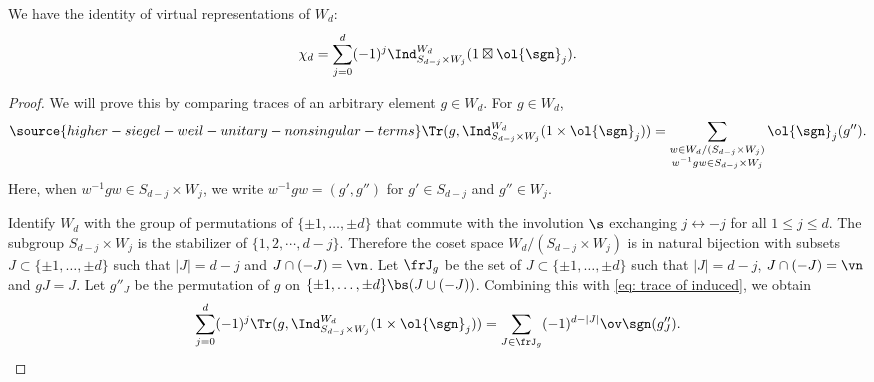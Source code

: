 \begin{lemma}
\notready We have the identity of virtual representations of $W_d$:
\[
\chi_d = \sum_{j=0}^{d} (-1)^j \Ind_{S_{d-j} \times W_j}^{W_d}(1 \boxtimes \ol{\sgn}_{j}).
\]
\end{lemma}
\begin{proof}
We will prove this by comparing traces of an arbitrary element $g \in W_d$.  For $g \in W_d$,
\begin{equation}\label{eq: trace of induced}
\source{higher-siegel-weil-unitary-nonsingular-terms}
\Tr(g, \Ind_{S_{d-j} \times W_j}^{W_d} (1 \times \ol{\sgn}_j))=\sum_{\substack{w\in W_{d}/(S_{d-j} \times W_j) \\ w^{-1}gw\in S_{d-j} \times W_j} } \ol{\sgn}_j(g'').
\end{equation}
Here, when $w^{-1}gw\in S_{d-j} \times W_j$, we write $w^{-1}gw=(g',g'')$ for $g'\in S_{d-j}$ and $g''\in W_{j}$.

Identify $W_d$ with the group of permutations of $\{\pm 1, \ldots, \pm d\}$ that commute with the involution $\s$ exchanging $j \leftrightarrow -j$ for all $1 \leq j \leq d$. The subgroup $S_{d-j}\times W_{j}$ is the stabilizer of $\{1,2,\cdots, d-j\}$. Therefore the coset space $W_{d}/(S_{d-j} \times W_j)$ is in natural bijection with subsets $J\subset \{\pm 1, \ldots, \pm d\}$ such that $|J|=d-j$ and $J\cap (-J)=\vn$. Let $\frJ_{g}$ be the set of $J\subset \{\pm 1, \ldots, \pm d\}$ such that $|J|=d-j$, $J\cap (-J)=\vn$ and $gJ=J$.  Let $g''_{J}$ be the permutation of $g$ on $\{\pm 1, \ldots, \pm d\}\bs (J\cup (-J))$. Combining this with \eqref{eq: trace of induced}, we obtain
\begin{equation}
\sum_{j=0}^{d}(-1)^{j}\Tr(g, \Ind_{S_{d-j} \times W_j}^{W_d} (1 \times \ol{\sgn}_j))=\sum_{J\in \frJ_{g}}(-1)^{d-|J|}\ov\sgn(g''_{J}).
\end{equation}








\end{proof}
